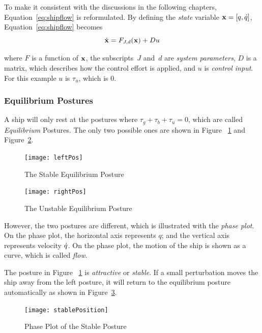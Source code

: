 To make it consistent with the discussions in the following chapters, Equation~\ref{eq:shipflow} is reformulated.
By defining the \emph{state} variable $\mathbf{x}=[q,\dot{q}]$,  Equation~\ref{eq:shipflow} becomes
\[
\dot{\mathbf{x}}=F_{J,d}(\mathbf{x})+Du
\]

where 
$F$ is a function of $\mathbf{x}$, the subscripts~$J$ and~$d$ are \emph{system parameters},
$D$ is a matrix, which describes how the control effort is applied,
and $u$ is \emph{control input}.
For this example $u$ is $\tau_{u}$, which is $0$.



\subsubsection*{Equilibrium Postures}
A ship will only rest at the postures where $\tau_{g}+\tau_{b}+\tau_{u}=0$, which are called \emph{Equilibrium} Postures.
The only two possible ones are shown in Figure ~\ref{fig:ShipEqulibriumStable} and Figure~\ref{fig:ShipEqulibriumUnstable}.
\begin{figure}[!htbp]
  \begin{center}
     \texttt{[image: leftPos]}
    \caption{The Stable Equilibrium Posture}
    \label{fig:ShipEqulibriumStable}
  \end{center}
\end{figure}

\begin{figure}[!htbp]
  \begin{center}
     \texttt{[image: rightPos]}
    \caption{The Unstable Equilibrium Posture}
    \label{fig:ShipEqulibriumUnstable}
  \end{center}
\end{figure}



However, the two postures are different, which is illustrated with the \emph{phase plot}.
On the phase plot, the horizontal axis represents  $q$; and the vertical axis represents velocity $\dot{q}$. 
On the phase plot, the motion of the ship is shown as a curve, which is called \emph{flow}.

The posture in Figure ~\ref{fig:ShipEqulibriumStable} is \emph{attractive} or \emph{stable}.
If a small perturbation moves the ship away from the left posture, it will return to the equilibrium posture automatically as shown in Figure~\ref{fig:StablePosture}.
\begin{figure}[!htbp]
  \begin{center}
      \texttt{[image: stablePosition]}
    \caption{Phase Plot of the Stable Posture}
    \label{fig:StablePosture}
  \end{center}
\end{figure}



